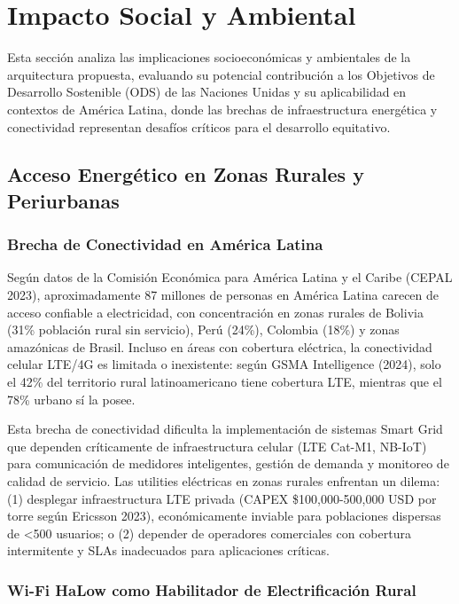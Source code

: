 \section{Impacto Social y Ambiental}

Esta sección analiza las implicaciones socioeconómicas y ambientales de la arquitectura propuesta, evaluando su potencial contribución a los Objetivos de Desarrollo Sostenible (ODS) de las Naciones Unidas y su aplicabilidad en contextos de América Latina, donde las brechas de infraestructura energética y conectividad representan desafíos críticos para el desarrollo equitativo.

\subsection{Acceso Energético en Zonas Rurales y Periurbanas}

\subsubsection{Brecha de Conectividad en América Latina}

Según datos de la Comisión Económica para América Latina y el Caribe (CEPAL 2023), aproximadamente 87 millones de personas en América Latina carecen de acceso confiable a electricidad, con concentración en zonas rurales de Bolivia (31\% población rural sin servicio), Perú (24\%), Colombia (18\%) y zonas amazónicas de Brasil. Incluso en áreas con cobertura eléctrica, la conectividad celular LTE/4G es limitada o inexistente: según GSMA Intelligence (2024), solo el 42\% del territorio rural latinoamericano tiene cobertura LTE, mientras que el 78\% urbano sí la posee.

Esta brecha de conectividad dificulta la implementación de sistemas Smart Grid que dependen críticamente de infraestructura celular (LTE Cat-M1, NB-IoT) para comunicación de medidores inteligentes, gestión de demanda y monitoreo de calidad de servicio. Las utilities eléctricas en zonas rurales enfrentan un dilema: (1) desplegar infraestructura LTE privada (CAPEX \$100,000-500,000 USD por torre según Ericsson 2023), económicamente inviable para poblaciones dispersas de <500 usuarios; o (2) depender de operadores comerciales con cobertura intermitente y SLAs inadecuados para aplicaciones críticas.

\subsubsection{Wi-Fi HaLow como Habilitador de Electrificación Rural}

